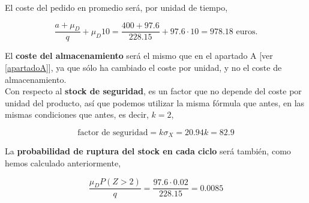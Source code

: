 \documentclass[a4paper,12pt]{article}
\begin{document}
El coste del pedido en promedio ser\'a, por unidad de tiempo,

$$ \dfrac{a + \mu_D}{q} + \mu_D 10 = \dfrac{400 + 97.6}{228.15} + 97.6\cdot 10 = 978.18 \text{ euros.} $$

\smallskip

El \textbf{coste del almacenamiento} ser\'a el mismo que en el apartado A [ver \ref{apartadoA}], ya que s\'olo ha cambiado el coste por unidad, y no el coste de almacenamiento. \\

Con respecto al \textbf{stock de seguridad}, es un factor que no depende del coste por unidad del producto, as\'i que podemos utilizar la misma f\'ormula que antes, en las mismas condiciones que antes, es decir, $k=2$,

$$ \text{factor de seguridad} = k\sigma_X = 20.94k = 82.9$$

\smallskip

La \textbf{probabilidad de ruptura del stock en cada ciclo} ser\'a tambi\'en, como hemos calculado anteriormente,

$$\dfrac{\mu_D P(Z > 2)}{q} = \dfrac{97.6\cdot 0.02}{228.15} = 0.0085$$ 
	
\end{document}
